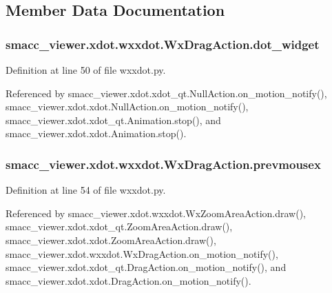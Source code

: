 \subsection{Member Data Documentation}
\subsubsection[{\texorpdfstring{dot\+\_\+widget}{dot_widget}}]{\setlength{\rightskip}{0pt plus 5cm}smacc\+\_\+viewer.\+xdot.\+wxxdot.\+Wx\+Drag\+Action.\+dot\+\_\+widget}\hypertarget{classsmacc__viewer_1_1xdot_1_1wxxdot_1_1WxDragAction_a65fbda850b66a28141394bb2a28c2fd1}{}\label{classsmacc__viewer_1_1xdot_1_1wxxdot_1_1WxDragAction_a65fbda850b66a28141394bb2a28c2fd1}


Definition at line 50 of file wxxdot.\+py.



Referenced by smacc\+\_\+viewer.\+xdot.\+xdot\+\_\+qt.\+Null\+Action.\+on\+\_\+motion\+\_\+notify(), smacc\+\_\+viewer.\+xdot.\+xdot.\+Null\+Action.\+on\+\_\+motion\+\_\+notify(), smacc\+\_\+viewer.\+xdot.\+xdot\+\_\+qt.\+Animation.\+stop(), and smacc\+\_\+viewer.\+xdot.\+xdot.\+Animation.\+stop().

\subsubsection[{\texorpdfstring{prevmousex}{prevmousex}}]{\setlength{\rightskip}{0pt plus 5cm}smacc\+\_\+viewer.\+xdot.\+wxxdot.\+Wx\+Drag\+Action.\+prevmousex}\hypertarget{classsmacc__viewer_1_1xdot_1_1wxxdot_1_1WxDragAction_aefb52d32e871e3a22f5c1dc6a95cba26}{}\label{classsmacc__viewer_1_1xdot_1_1wxxdot_1_1WxDragAction_aefb52d32e871e3a22f5c1dc6a95cba26}


Definition at line 54 of file wxxdot.\+py.



Referenced by smacc\+\_\+viewer.\+xdot.\+wxxdot.\+Wx\+Zoom\+Area\+Action.\+draw(), smacc\+\_\+viewer.\+xdot.\+xdot\+\_\+qt.\+Zoom\+Area\+Action.\+draw(), smacc\+\_\+viewer.\+xdot.\+xdot.\+Zoom\+Area\+Action.\+draw(), smacc\+\_\+viewer.\+xdot.\+wxxdot.\+Wx\+Drag\+Action.\+on\+\_\+motion\+\_\+notify(), smacc\+\_\+viewer.\+xdot.\+xdot\+\_\+qt.\+Drag\+Action.\+on\+\_\+motion\+\_\+notify(), and smacc\+\_\+viewer.\+xdot.\+xdot.\+Drag\+Action.\+on\+\_\+motion\+\_\+notify().

